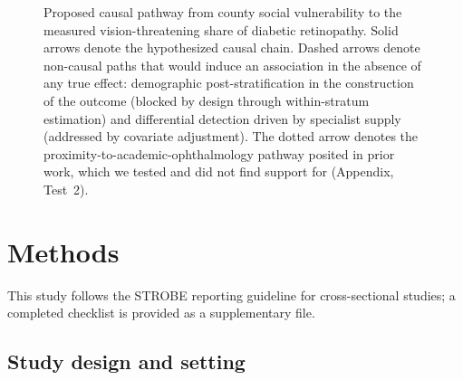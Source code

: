 \documentclass[11pt]{article}
\begin{document}
\begin{figure}[htbp]
{}
\caption{Proposed causal pathway from county social vulnerability to the
measured vision-threatening share of diabetic retinopathy. Solid arrows denote
the hypothesized causal chain. Dashed arrows denote non-causal paths that would
induce an association in the absence of any true effect: demographic
post-stratification in the construction of the outcome (blocked by design
through within-stratum estimation) and differential detection driven by
specialist supply (addressed by covariate adjustment). The dotted arrow denotes
the proximity-to-academic-ophthalmology pathway posited in prior work, which we
tested and did not find support for (Appendix, Test~2).}
\label{fig:dag}
\end{figure}

\clearpage

\section{Methods}

This study follows the STROBE reporting guideline for cross-sectional studies; a
completed checklist is provided as a supplementary file.

\subsection{Study design and setting}
\end{document}
